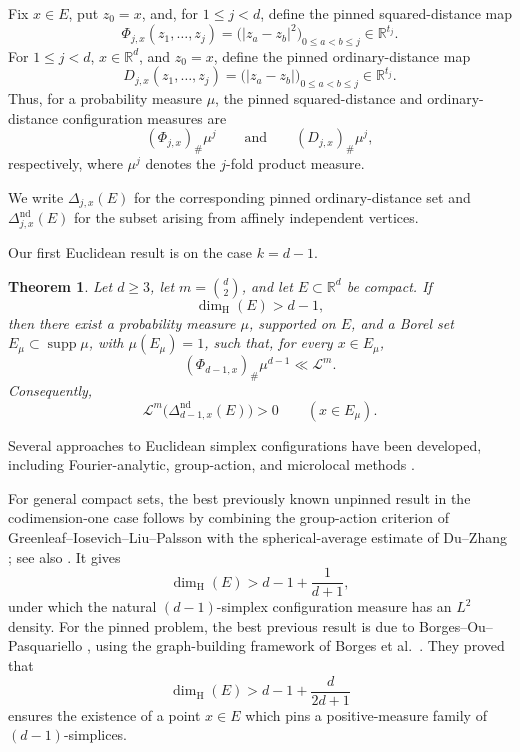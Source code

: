 \documentclass[11pt]{article}
\newtheorem{theorem}{Theorem}[section]
\theoremstyle{remark}
\newcommand{\R}{\mathbb R}
\newcommand{\cL}{\mathcal L}
\newcommand{\supp}{\operatorname{supp}}
\numberwithin{equation}{section}
\newcommand{\1}{\mathbf 1}
\begin{document}
Fix \(x\in E\), put \(z_0=x\), and, for \(1\leq j<d\), define the
pinned squared-distance map
\begin{equation}
\Phi_{j,x}(z_1,\ldots,z_j)
=
\bigl(\lvert z_a-z_b\rvert^2\bigr)_{0\leq a<b\leq j}
\in\R^{t_j}.
\label{eq:pinned-map-intro}
\end{equation}
For $1\le j<d$, $x\in\R^d$, and $z_0=x$, define the pinned
ordinary-distance map
\[
D_{j,x}(z_1,\ldots,z_j)
=
\bigl(
|z_a-z_b|
\bigr)_{0\le a<b\le j}
\in\R^{t_j}.
\]
Thus, for a probability measure $\mu$, the pinned squared-distance and
ordinary-distance configuration measures are
\[
(\Phi_{j,x})_\#\mu^j
\qquad\text{and}\qquad
(D_{j,x})_\#\mu^j,
\]
respectively, where $\mu^j$ denotes the $j$-fold product measure.



We write \(\Delta_{j,x}(E)\) for the corresponding pinned
ordinary-distance set and \(\Delta_{j,x}^{\mathrm{nd}}(E)\) for the
subset arising from affinely independent vertices.


Our first Euclidean result is on the case $k=d-1$.


\begin{theorem}\label{thm:euclidean-codim-one}
Let \(d\geq3\), let \(m=\binom d2\), and let \(E\subset\R^d\) be
compact.  If
\[
        \dim_{\mathrm H}(E)>d-1,
\]
then there exist a probability measure \(\mu\), supported on \(E\),
and a Borel set \(E_\mu\subset\supp\mu\), with \(\mu(E_\mu)=1\), such
that, for every \(x\in E_\mu\),
\[
        (\Phi_{d-1,x})_\#\mu^{d-1}\ll\cL^m.
\]
Consequently,
\[
        \cL^m\bigl(\Delta_{d-1,x}^{\mathrm{nd}}(E)\bigr)>0
        \qquad (x\in E_\mu).
\]
\end{theorem}

Several approaches to Euclidean simplex configurations have been
developed, including Fourier-analytic, group-action, and microlocal
methods
\cite{EHI,GGIP,GILP,GILPElementary,GIT,GITMicrolocal, IPPS}.

For general compact sets, the best previously known unpinned result in
the codimension-one case follows by combining the group-action
criterion of Greenleaf--Iosevich--Liu--Palsson \cite{GILP} with the
spherical-average estimate of Du--Zhang \cite{DuZhang}; see also
\cite[Theorem~1.16]{BOP}.  It gives
\[
 \dim_{\mathrm H}(E)>d-1+\frac1{d+1},
\]
under which the natural \((d-1)\)-simplex configuration measure has an
\(L^2\) density. For the pinned problem, the best previous result is due to
Borges--Ou--Pasquariello \cite[Corollary~1.18]{BOP}, using the
graph-building framework of Borges et al.\
\cite[Theorem~B]{BFOPR}.  They proved that
\[
 \dim_{\mathrm H}(E)>
 d-1+\frac{d}{2d+1}
\]
ensures the existence of a point \(x\in E\) which pins a
positive-measure family of \((d-1)\)-simplices.
\end{document}
